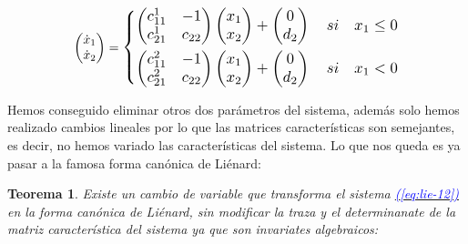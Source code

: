 \documentclass[12pt,a4paper]{report} %
\newtheorem{theorem}{Teorema}
\newcommand{\eref}[1]{\hyperref[#1]{\textcolor{blue}{\textit{(\ref*{#1})}}}}
\begin{document}
	\begin{equation}
		\begin{pmatrix*}[r]
			\dot{x}_1 \\ \dot{x}_2
		\end{pmatrix*}=
		\label{eq:lie-12}
		\scalebox{1.2}{$\displaystyle
			\left\{
			\begin{aligned}
				\begin{pmatrix*}[r]
					c_{11}^1 & -1 \\
					c_{21}^1 & c_{22}
				\end{pmatrix*}\begin{pmatrix*}[r]
				x_1\\x_2
				\end{pmatrix*}+\begin{pmatrix*}[c]
				0 \\ d_2
				\end{pmatrix*} \quad si \quad x_1 \leq 0 \\
				\begin{pmatrix*}[r]
					c_{11}^2 & -1 \\
					c_{21}^2 & c_{22}
				\end{pmatrix*}\begin{pmatrix*}[r]
				x_1\\x_2
				\end{pmatrix*}+\begin{pmatrix*}[c]
				0 \\ d_2
				\end{pmatrix*} \quad si \quad x_1 < 0
			\end{aligned}
			\right.
			$} 
	\end{equation}\smallskip
	
	Hemos conseguido eliminar otros dos parámetros del sistema, además solo hemos realizado cambios lineales por lo que las matrices características son semejantes, es decir, no hemos variado las características del sistema. Lo que nos queda es ya pasar a la famosa forma canónica de Liénard:
	
	
	\begin{theorem}\label{t2}
		Existe un cambio de variable que transforma el sistema \eref{eq:lie-12} en la forma canónica de Liénard, sin modificar la traza y el determinanate de la matriz característica del sistema ya que son invariates algebraicos:
	\end{theorem}
	
\end{document}

